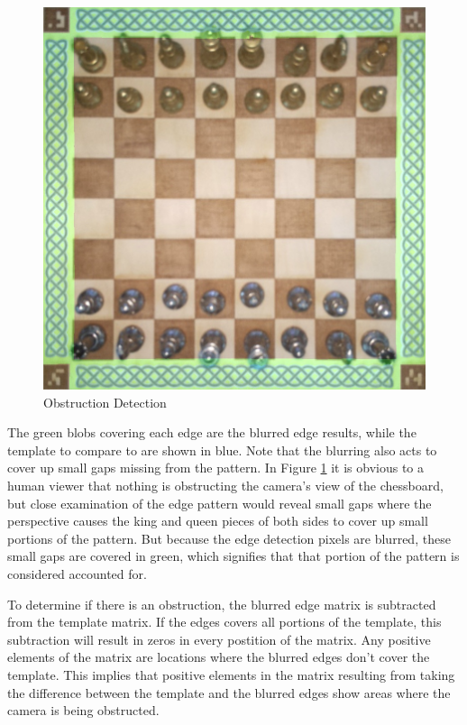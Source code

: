 \documentclass[journal]{IEEEtran}
\begin{document}
\begin{figure}[!ht]
	\centering
	\includegraphics[width=\linewidth]{Images/KnotDetection.jpg}
	\caption{Obstruction Detection}
	\label{knot}
\end{figure}

The green blobs covering each edge are the blurred edge results, while the template to compare to are shown in blue.
Note that the blurring also acts to cover up small gaps missing from the pattern. In Figure \ref{knot} it is obvious to a human viewer that nothing is obstructing the camera's view of the chessboard, but close examination of the edge pattern would reveal small gaps where the perspective causes the king and queen pieces of both sides to cover up small portions of the pattern. But because the edge detection pixels are blurred, these small gaps are covered in green, which signifies that that portion of the pattern is considered accounted for.

To determine if there is an obstruction, the blurred edge matrix is subtracted from the template matrix. If the edges covers all portions of the template, this subtraction will result in zeros in every postition of the matrix. Any positive elements of the matrix are locations where the blurred edges don't cover the template. This implies that positive elements in the matrix resulting from taking the difference between the template and the blurred edges show areas where the camera is being obstructed.
\end{document}
